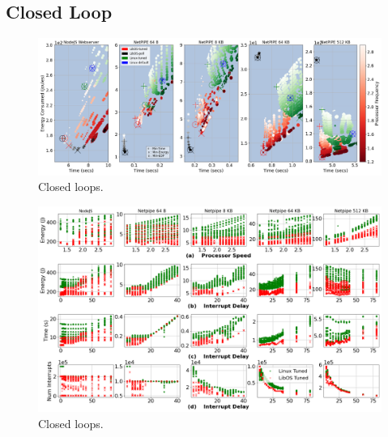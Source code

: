 \subsection{Closed Loop}
\label{sec:closed_loop}
\begin{figure}
\centering
\includegraphics[width=1\textwidth]{figures/closed_loop_overview.png}
\caption[]
{Closed loops.}
\label{fig:closed_loop_overview}
\end{figure}
\begin{figure}
\centering
\includegraphics[width=1\textwidth]{figures/closed_detail_1.png}
\caption[]
{Closed loops.}
\label{fig:closed_loop_detail_1}
\end{figure}

